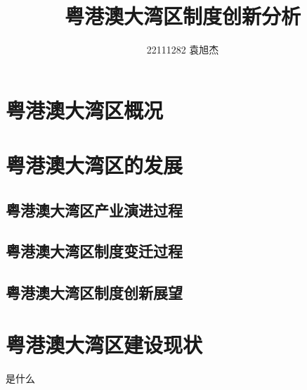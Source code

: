 \documentclass[UTF8]{article}
\title{粤港澳大湾区制度创新分析}
\author{22111282 袁旭杰}
\begin{document}
    \maketitle
    \tableofcontents
    \rmfamily
    \mdseries\itshape
    \section{粤港澳大湾区概况}
    \section{粤港澳大湾区的发展}
    \subsection{粤港澳大湾区产业演进过程} 
    \subsection{粤港澳大湾区制度变迁过程}  
    \subsection{粤港澳大湾区制度创新展望}    
    \section{粤港澳大湾区建设现状} 
    是什么
\end{document}
